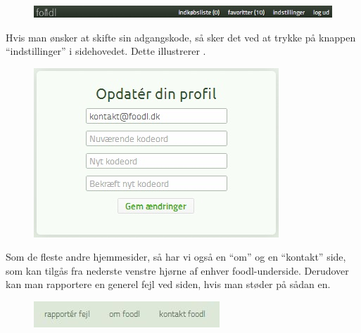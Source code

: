 \begin{figure}[H]
	\centering
	\includegraphics[scale=0.7]{billeder/foodl/header-login.jpg}
	\label{fig:foodl-loggetind}
\end{figure}

Hvis man ønsker at skifte sin adgangskode, så sker det ved at trykke på knappen ``indstillinger'' i sidehovedet. Dette illustrerer .

\begin{figure}[H]
	\centering
	\includegraphics[scale=0.7]{billeder/foodl/indstillinger.jpg}
	\label{fig:foodl-indstillinger}
\end{figure}

Som de fleste andre hjemmesider, så har vi også en ``om'' og en ``kontakt'' side, som kan tilgås fra nederste venstre hjørne af enhver foodl-underside. Derudover kan man rapportere en generel fejl ved siden, hvis man støder på sådan en.

\begin{figure}[H]
	\centering
	\includegraphics[scale=0.7]{billeder/foodl/formaliteter.jpg}
	\label{fig:foodl-formaliteter}
\end{figure}